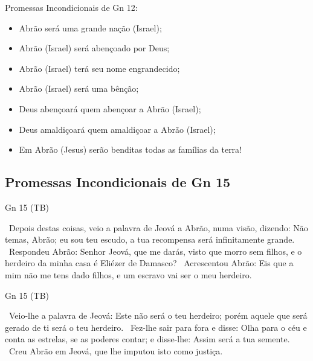\documentclass[12pt,aspectratio=169]{beamer}
\newcommand{\ver}[1]{%
    \raisebox{0.50ex}{%
        \scalebox{1.1}{%
            \pmb{\textbf{\textcolor{BSpbg}{#1}}}%
        }%
    }%
}
\newcommand{\QUOTE}[1]{%
    \par\noindent\hspace*{0.05\linewidth}%
    \begin{minipage}{0.9\linewidth}%
        \linespread{1.35}\large{#1}%
    \end{minipage}%
}
\newcommand{\RED}[1]{{\textcolor{TXred}{#1}}}
\newcommand{\YEL}[1]{{\textcolor{TXyel}{#1}}}
\newcommand{\GRE}[1]{{\textcolor{TXgre}{#1}}}
\newcommand{\CYA}[1]{{\textcolor{TXcya}{#1}}}
\newcommand{\MAG}[1]{{\textcolor{TXmag}{#1}}}
\newcommand{\BRI}[1]{{\textcolor{BSpbg}{#1}}}   %
\begin{document}
    \begin{frame}{Promessas \YEL{Incondicionais} de \BRI{Gn 12}:}
        \begin{itemize}
            \item<1-> Abrão será uma \YEL{grande nação} (Israel);
            \item<2-> Abrão (Israel) será \YEL{abençoado por Deus};
            \item<3-> Abrão (Israel) terá seu \YEL{nome engrandecido};
            \item<4-> Abrão (Israel) será uma \YEL{bênção};
            \item<5-> Deus \GRE{abençoará quem abençoar} a Abrão (Israel);
            \item<6-> Deus \RED{amaldiçoará quem amaldiçoar} a Abrão (Israel);
            \item<7-> Em Abrão (Jesus) serão \MAG{benditas todas as famílias da terra}!
        \end{itemize}
    \end{frame}

    \subsection{Promessas \BRI{Incondicionais} de Gn 15}

    \begin{frame}{Gn 15 (TB)}
        \QUOTE{%
            \ver{1}~Depois destas coisas, veio a palavra de Jeová a Abrão, numa visão, dizendo:
            Não temas, Abrão; eu sou teu \YEL{escudo}, a tua \YEL{recompensa} será infinitamente
            grande.
            \ver{2}~Respondeu Abrão: Senhor Jeová, que me darás, visto que morro sem filhos, e o
            herdeiro da minha casa é Eliézer de Damasco?
            \ver{3}~Acrescentou Abrão: Eis que a mim não me tens dado filhos, e um escravo vai
            ser o meu herdeiro.
        }
    \end{frame}

    \begin{frame}{Gn 15 (TB)}
        \QUOTE{%
            \ver{4}~Veio-lhe a palavra de Jeová: Este não será o teu herdeiro; porém aquele que
            será \YEL{gerado de ti} será o teu herdeiro.
            \ver{5}~Fez-lhe sair para fora e disse: Olha para o céu e \CYA{conta as estrelas},
            se as poderes contar; e disse-lhe: \YEL{Assim será a tua semente}.
            \ver{6}~\GRE{Creu} Abrão em Jeová, que \GRE{lhe imputou isto como justiça}.
        }
    \end{frame}
\end{document}
